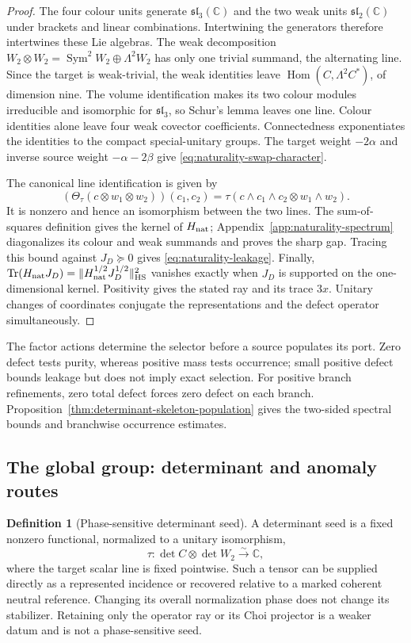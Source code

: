 \documentclass[11pt]{article}
\numberwithin{equation}{section}
\theoremstyle{definition}
\newtheorem{definition}[theorem]{Definition}
\theoremstyle{remark}
\newcommand{\C}{\mathbb C}
\newcommand{\Tr}{\operatorname{Tr}}
\newcommand{\Hom}{\operatorname{Hom}}
\newcommand{\HS}{\mathrm{HS}}
\begin{document}
\begin{proof}
The four colour units generate $\mathfrak{sl}_3(\C)$ and the two weak units
$\mathfrak{sl}_2(\C)$ under brackets and linear combinations.  Intertwining
the generators therefore intertwines these Lie algebras.
The weak decomposition
$W_2\otimes W_2=\operatorname{Sym}^2W_2\oplus\Lambda^2W_2$
has only one trivial summand, the alternating line.  Since the target is
weak-trivial, the weak identities leave $\Hom(C,\Lambda^2C^*)$, of dimension
nine.  The volume identification makes its two colour modules irreducible
and isomorphic for $\mathfrak{sl}_3$, so Schur's lemma leaves one line.
Colour identities alone leave four weak covector coefficients.
Connectedness exponentiates the identities to the compact special-unitary
groups.  The target weight $-2\alpha$ and inverse source weight
$-\alpha-2\beta$ give \eqref{eq:naturality-swap-character}.

The canonical line identification is given by
\[
 (\Theta_\tau(c\otimes w_1\otimes w_2))(c_1,c_2)
 =\tau(c\wedge c_1\wedge c_2\otimes w_1\wedge w_2).
\]
It is nonzero and hence an isomorphism between the two lines.
The sum-of-squares definition gives the kernel of $H_{\rm nat}$;
Appendix~\ref{app:naturality-spectrum} diagonalizes its colour and weak
summands and proves the sharp gap.  Tracing this bound against $J_D\succeq0$
gives \eqref{eq:naturality-leakage}.  Finally,
$\Tr(H_{\rm nat}J_D)=\|H_{\rm nat}^{1/2}J_D^{1/2}\|_{\HS}^2$ vanishes
exactly when $J_D$ is supported on the one-dimensional kernel.  Positivity
gives the stated ray and its trace $3x$.  Unitary changes of coordinates
conjugate the representations and the defect operator simultaneously.
\end{proof}

The factor actions determine the selector before a source populates its
port.  Zero defect tests purity, whereas positive mass tests occurrence;
small positive defect bounds leakage but does not imply exact selection.
For positive branch refinements, zero total defect forces zero defect on
each branch.  Proposition~\ref{thm:determinant-skeleton-population} gives the
two-sided spectral bounds and branchwise occurrence estimates.


\subsection{The global group: determinant and anomaly routes}

\begin{definition}[Phase-sensitive determinant seed]
A determinant seed is a fixed nonzero functional, normalized to a unitary
isomorphism,
\begin{equation}
 \tau:\det C\otimes\det W_2\xrightarrow{\sim}\C,
 \label{eq:determinant-seed}
\end{equation}
where the target scalar line is fixed pointwise.  Such a tensor can be
supplied directly as a represented incidence or recovered relative to a
marked coherent neutral reference.  Changing its overall normalization
phase does not change its stabilizer.  Retaining only the operator ray or
its Choi projector is a weaker datum and is not a phase-sensitive seed.
\end{definition}
\end{document}
